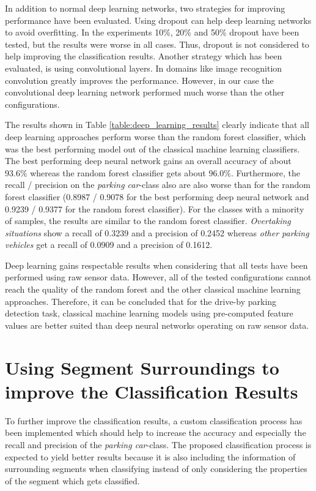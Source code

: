 In addition to normal deep learning networks, two strategies for improving performance have been evaluated. Using dropout can help deep learning networks to avoid overfitting. In the experiments 10\%, 20\% and 50\% dropout have been tested, but the results were worse in all cases. Thus, dropout is not considered to help improving the classification results. Another strategy which has been evaluated, is using convolutional layers. In domains like image recognition convolution greatly improves the performance. However, in our case the convolutional deep learning network performed much worse than the other configurations.

The results shown in Table \ref{table:deep_learning_results} clearly indicate that all deep learning approaches perform worse than the random forest classifier, which was the best performing model out of the classical machine learning classifiers. The best performing deep neural network gains an overall accuracy of about 93.6\% whereas the random forest classifier gets about 96.0\%. Furthermore, the recall / precision on the \emph{parking car}-class also are also worse than for the random forest classifier (0.8987 / 0.9078 for the best performing deep neural network and 0.9239 / 0.9377 for the random forest classifier). For the classes with a minority of samples, the results are similar to the random forest classifier. \emph{Overtaking situations} show a recall of 0.3239 and a precision of 0.2452 whereas \emph{other parking vehicles} get a recall of 0.0909 and a precision of 0.1612.

Deep learning gains respectable results when considering that all tests have been performed using raw sensor data. However, all of the tested configurations cannot reach the quality of the random forest and the other classical machine learning approaches. Therefore, it can be concluded that for the drive-by parking detection task, classical machine learning models using pre-computed feature values are better suited than deep neural networks operating on raw sensor data.






\section{Using Segment Surroundings to improve the Classification Results}
\label{sec:using_surroundings_to_improve_results}

To further improve the classification results, a custom classification process has been implemented which should help to increase the accuracy and especially the recall and precision of the \emph{parking car}-class. The proposed classification process is expected to yield better results because it is also including the information of surrounding segments when classifying instead of only considering the properties of the segment which gets classified.

